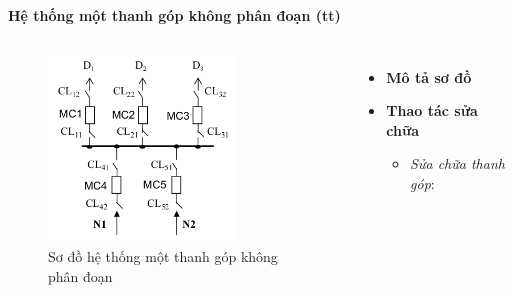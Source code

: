 \documentclass{beamer}
\begin{document}
\begin{frame}{\textbf{Hệ thống một thanh góp không phân đoạn (tt)}}
\begin{columns}
\begin{figure}[h]
\includegraphics[width=5cm, height=5cm]{mtgkpd}
\caption{Sơ đồ hệ thống một thanh góp không phân đoạn}
\end{figure}

\begin{itemize}
\item \textbf{Mô tả sơ đồ}
\item \textbf{Thao tác sửa chữa}
\begin{itemize}
\item <1-> \emph{Sửa chữa thanh góp}: 
\end{itemize}
\end{itemize}
\end{columns}
\end{frame}
\end{document}
